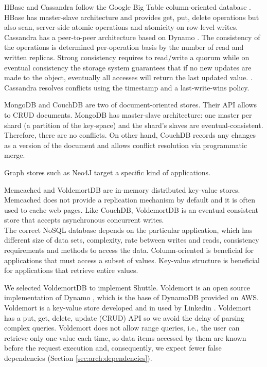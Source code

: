 HBase and Cassandra follow the Google Big Table column-oriented database \cite{Chang2008}. HBase has master-slave architecture and provides get, put, delete operations but also scan, server-side atomic operations and atomicity on row-level writes. Cassandra has a peer-to-peer architecture based on Dynamo \cite{Decandia2007}. The consistency of the operations is determined per-operation basis by the number of read and written replicas. Strong consistency requires to read/write a quorum while on eventual consistency the storage system guarantees that if no new updates are made to the object, eventually all accesses will return the last updated value. \cite{Decandia2007}. Cassandra resolves conflicts using the timestamp and a last-write-wins policy. 

MongoDB and CouchDB are two of document-oriented stores. Their \ac{API} allows to \acf{CRUD} documents. MongoDB has master-slave architecture: one master per shard (a partition of the key-space) and the shard's slaves are eventual-consistent. Therefore, there are no conflicts. On other hand, CouchDB records any changes as a version of the document and allows conflict resolution via programmatic merge. 

Graph stores such as Neo4J target a specific kind of applications.

Memcached and VoldemortDB are in-memory distributed key-value stores. Memcached does not provide a replication mechanism by default and it is often used to cache web pages. Like CouchDB, VoldemortDB is an eventual consistent store that accepts asynchronous concurrent writes.\\

The correct \acs{NoSQL} database depends on the particular application, which has different size of data sets, complexity, rate between writes and reads, consistency requirements and methods to access the data. Column-oriented is beneficial for applications that must access a subset of values. Key-value structure is beneficial for applications that retrieve entire values. 

We selected VoldemortDB \cite{Kreps} to implement Shuttle. Voldemort is an open source implementation of Dynamo \cite{Decandia2007}, which is the base of DynamoDB provided on \ac{AWS}. Voldemort is a key-value store developed and in used by Linkedin \cite{linkedin}. Voldemort has a put, get, delete, update (\ac{CRUD}) \ac{API} so we avoid the delay of parsing complex queries. Voldemort does not allow range queries, i.e., the user can retrieve only one value each time, so data items accessed by them are known before the request execution and, consequently, we expect fewer false dependencies (Section \ref{sec:arch:dependencies}). 


